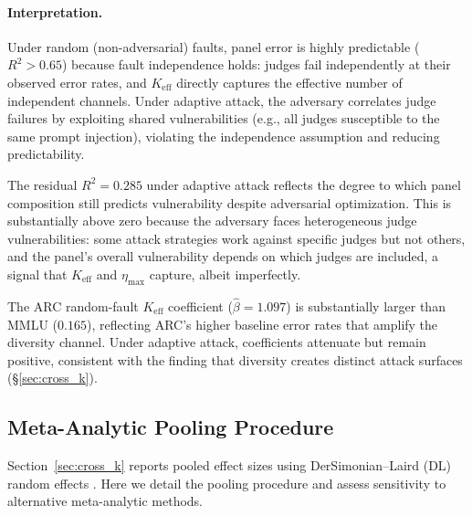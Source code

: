 \paragraph{Interpretation.} Under random (non-adversarial) faults, panel error is highly predictable ($R^2{>}0.65$) because fault independence holds: judges fail independently at their observed error rates, and $K_{\mathrm{eff}}$ directly captures the effective number of independent channels. Under adaptive attack, the adversary correlates judge failures by exploiting shared vulnerabilities (e.g., all judges susceptible to the same prompt injection), violating the independence assumption and reducing predictability.

The residual $R^2 = 0.285$ under adaptive attack reflects the degree to which panel composition still predicts vulnerability despite adversarial optimization. This is substantially above zero because the adversary faces heterogeneous judge vulnerabilities: some attack strategies work against specific judges but not others, and the panel's overall vulnerability depends on which judges are included, a signal that $K_{\mathrm{eff}}$ and $\eta_{\max}$ capture, albeit imperfectly.

The ARC random-fault $K_{\mathrm{eff}}$ coefficient ($\hat{\beta}{=}1.097$) is substantially larger than MMLU ($0.165$), reflecting ARC's higher baseline error rates that amplify the diversity channel. Under adaptive attack, coefficients attenuate but remain positive, consistent with the finding that diversity creates distinct attack surfaces (\S\ref{sec:cross_k}).

\subsection{Meta-Analytic Pooling Procedure}
\label{app:meta_analytic_details}

Section~\ref{sec:cross_k} reports pooled effect sizes using DerSimonian--Laird (DL) random effects \citep{dersimonian1986meta}. Here we detail the pooling procedure and assess sensitivity to alternative meta-analytic methods.

